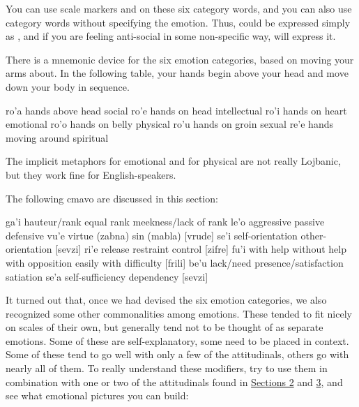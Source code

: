 You can use scale markers and  on these six category
    words, and you can also use category words without specifying
    the emotion. Thus,  could be
    expressed simply as , and if you are feeling
    anti-social in some non-specific way,  will express
    it.

There is a mnemonic device for the six emotion categories,
    based on moving your arms about. In the following table, your
    hands begin above your head and move down your body in
    sequence.

   ro'a    hands above head    social
    ro'e    hands on head       intellectual
    ro'i    hands on heart      emotional
    ro'o    hands on belly      physical
    ro'u    hands on groin      sexual
    re'e    hands moving around spiritual

The implicit metaphors  for emotional and 
    for physical are not really Lojbanic, but they work fine for
    English-speakers.



The following cmavo are discussed in this section:

   ga'i    hauteur/rank    equal rank  meekness/lack of rank
    le'o    aggressive  passive     defensive
    vu'e    virtue (zabna)          sin (mabla)
            [vrude]
    se'i    self-orientation        other-orientation
            [sevzi]
    ri'e    release     restraint   control
            [zifre]
    fu'i    with help      without help with opposition
        easily              with difficulty
            [frili]
    be'u     lack/need  presence/satisfaction   satiation
    se'a     self-sufficiency           dependency
            [sevzi]

It turned out that, once we had devised the six emotion
    categories, we also recognized some other commonalities among
    emotions. These tended to fit nicely on scales of their own,
    but generally tend not to be thought of as separate emotions.
    Some of these are self-explanatory, some need to be placed in
    context. Some of these tend to go well with only a few of the
    attitudinals, others go with nearly all of them. To really
    understand these modifiers, try to use them in combination with
    one or two of the attitudinals found in \hyperref[sec:13:2]{Sections
    2} and \hyperref[sec:13:3]{3}, and see what emotional pictures
    you can build: 

